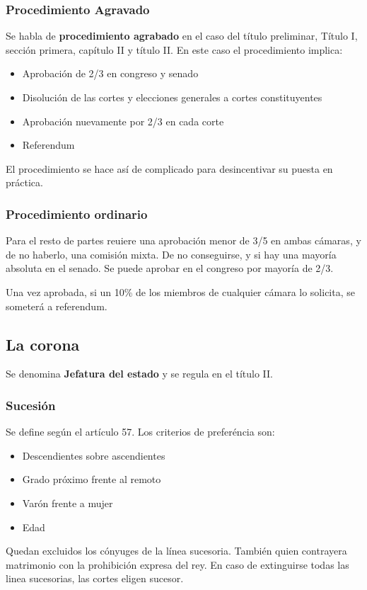     \subsubsection{Procedimiento Agravado}
        Se habla de \textbf{procedimiento agrabado} en el caso del título preliminar, Título I, sección primera, capítulo II y título II. En este caso el procedimiento implica:
        \begin{itemize}
            \item Aprobación de 2/3 en congreso y senado
            \item Disolución de las cortes y elecciones generales a cortes constituyentes
            \item Aprobación nuevamente por 2/3 en cada corte
            \item Referendum
        \end{itemize}
        El procedimiento se hace así de complicado para desincentivar su puesta en práctica.

    \subsubsection{Procedimiento ordinario}
        Para el resto de partes reuiere una aprobación menor de 3/5  en ambas cámaras, y de no haberlo, una comisión mixta. De no conseguirse, y si hay una mayoría absoluta en el senado. Se puede aprobar en el congreso por mayoría de 2/3.

        Una vez aprobada, si un 10\% de los miembros de cualquier cámara lo solicita, se someterá a referendum.

\subsection{La corona}
    Se denomina \textbf{Jefatura del estado} y se regula en el título II.

    \subsubsection{Sucesión}
        Se define según el artículo 57. Los criterios de preferéncia son:
        \begin{itemize}
            \item Descendientes sobre ascendientes
            \item Grado próximo frente al remoto
            \item Varón frente a mujer
            \item Edad
        \end{itemize}
        Quedan excluidos los cónyuges de la línea sucesoria. También quien contrayera matrimonio con la prohibición expresa del rey. En caso de extinguirse todas las linea sucesorias, las cortes eligen sucesor.

